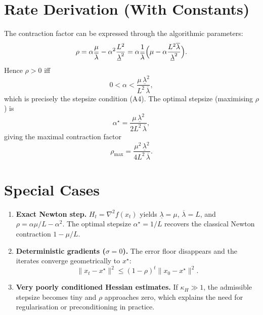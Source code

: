 \documentclass{article}
\begin{document}
\section*{Rate Derivation (With Constants)}
The contraction factor can be expressed through the algorithmic parameters:
\[
\rho
= \alpha\frac{\mu}{\overline{\lambda}}-\alpha^{2}\frac{L^{2}}{\underline{\lambda}^{2}}
= \alpha\frac{1}{\overline{\lambda}}\Bigl(\mu-\alpha\frac{L^{2}\overline{\lambda}}{\underline{\lambda}^{2}}\Bigr).
\]
Hence $\rho>0$ iff
\[
0<\alpha<\frac{\mu\,\underline{\lambda}^{2}}{L^{2}\,\overline{\lambda}},
\]
which is precisely the stepsize condition (A4). The optimal stepsize (maximising $\rho$) is
\[
\alpha^{\star}= \frac{\mu\,\underline{\lambda}^{2}}{2L^{2}\,\overline{\lambda}},
\]
giving the maximal contraction factor
\[
\rho_{\max}= \frac{\mu^{2}\,\underline{\lambda}^{2}}{4L^{2}\,\overline{\lambda}}.
\]

\section*{Special Cases}
\begin{enumerate}
\item \textbf{Exact Newton step.} $H_{t}=\nabla^{2}f(x_{t})$ yields $\underline{\lambda}=\mu$, $\overline{\lambda}=L$, and $\rho=\alpha\mu/L-\alpha^{2}$. The optimal stepsize $\alpha^{\star}=1/L$ recovers the classical Newton contraction $1-\mu/L$.

\item \textbf{Deterministic gradients ($\sigma=0$).} The error floor disappears and the iterates converge geometrically to $x^{\star}$:
\[
\|x_{t}-x^{\star}\|^{2}\le (1-\rho)^{t}\|x_{0}-x^{\star}\|^{2}.
\]

\item \textbf{Very poorly conditioned Hessian estimates.} If $\kappa_{H}\gg 1$, the admissible stepsize becomes tiny and $\rho$ approaches zero, which explains the need for regularisation or preconditioning in practice.
\end{enumerate}
\end{document}

